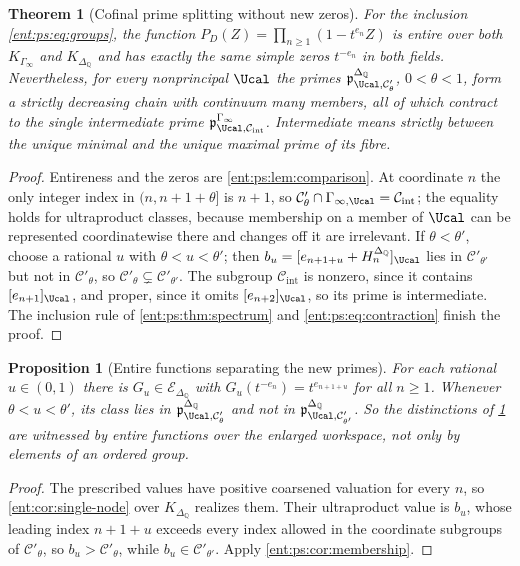 \documentclass[11pt]{article}
\newtheorem{theorem}{Theorem}[section]
\theoremstyle{plain}
\theoremstyle{plain}
\newtheorem{proposition}[proposition]{Proposition}
\theoremstyle{plain}
\theoremstyle{definition}
\theoremstyle{definition}
\theoremstyle{definition}
\theoremstyle{definition}
\theoremstyle{remark}
\newcommand{\Q}{\mathbb Q}\newcommand{\Z}{\mathbb Z}\newcommand{\N}{\mathbb N}
\begin{document}
\begin{theorem}[Cofinal prime splitting without new zeros]
\label{ent:ps:thm:splitting}
For the inclusion \eqref{ent:ps:eq:groups}, the function
$P_D(Z)=\prod_{n\ge1}(1-t^{e_n}Z)$ is entire over both $K_{\Gamma_\infty}$
and $K_{\Delta_\Q}$ and has exactly the same simple zeros $t^{-e_n}$ in both
fields. Nevertheless, for every nonprincipal $\Ucal$ the primes
$\mathfrak p^{\Delta_\Q}_{\Ucal,\mathcal C'_\theta}$, $0<\theta<1$, form a
strictly decreasing chain with continuum many members, all of which contract
to the single intermediate prime
$\mathfrak p^{\Gamma_\infty}_{\Ucal,\mathcal C_{\mathrm{int}}}$.
Intermediate means strictly between the unique minimal and the unique maximal
prime of its fibre.
\end{theorem}
\begin{proof}
Entireness and the zeros are \cref{ent:ps:lem:comparison}. At coordinate $n$
the only integer index in $(n,n+1+\theta]$ is $n+1$, so
$\mathcal C'_\theta\cap\Gamma_{\infty,\Ucal}=\mathcal C_{\mathrm{int}}$; the
equality holds for ultraproduct classes, because membership on a member of
$\Ucal$ can be represented coordinatewise there and changes off it are
irrelevant. If $\theta<\theta'$, choose a rational $u$ with
$\theta<u<\theta'$; then $b_u=[e_{n+1+u}+H_n^{\Delta_\Q}]_\Ucal$ lies in
$\mathcal C'_{\theta'}$ but not in $\mathcal C'_\theta$, so
$\mathcal C'_\theta\subsetneq\mathcal C'_{\theta'}$. The subgroup
$\mathcal C_{\mathrm{int}}$ is nonzero, since it contains
$[e_{n+1}]_\Ucal$, and proper, since it omits $[e_{n+2}]_\Ucal$, so its prime
is intermediate. The inclusion rule of \cref{ent:ps:thm:spectrum} and
\eqref{ent:ps:eq:contraction} finish the proof.
\end{proof}

\begin{proposition}[Entire functions separating the new primes]
\label{ent:ps:prop:splitting-witness}
For each rational $u\in(0,1)$ there is $G_u\in\mathcal E_{\Delta_\Q}$ with
$G_u(t^{-e_n})=t^{e_{n+1+u}}$ for all $n\ge1$. Whenever $\theta<u<\theta'$,
its class lies in $\mathfrak p^{\Delta_\Q}_{\Ucal,\mathcal C'_\theta}$ and not
in $\mathfrak p^{\Delta_\Q}_{\Ucal,\mathcal C'_{\theta'}}$. So the
distinctions of \cref{ent:ps:thm:splitting} are witnessed by entire functions
over the enlarged workspace, not only by elements of an ordered group.
\end{proposition}
\begin{proof}
The prescribed values have positive coarsened valuation for every $n$, so
\cref{ent:cor:single-node} over $K_{\Delta_\Q}$ realizes them. Their
ultraproduct value is $b_u$, whose leading index $n+1+u$ exceeds every index
allowed in the coordinate subgroups of $\mathcal C'_\theta$, so
$b_u>\mathcal C'_\theta$, while $b_u\in\mathcal C'_{\theta'}$. Apply
\cref{ent:ps:cor:membership}.
\end{proof}
\end{document}
